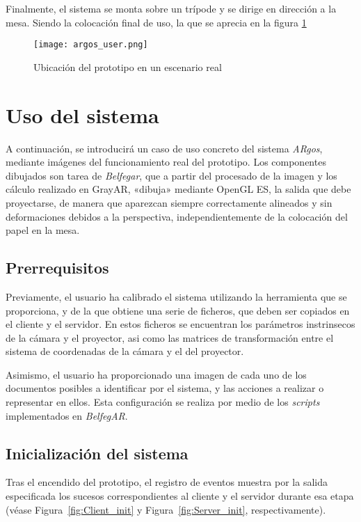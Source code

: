 Finalmente, el sistema se monta sobre un trípode y se dirige en dirección a la mesa. Siendo la colocación final de uso, la que se aprecia en la figura \ref{fig:ARgos_user} 

\begin{figure}
  \begin{center}
    \texttt{[image: argos\_user.png]}
    \caption{Ubicación del prototipo en un escenario real}
    \label{fig:ARgos_user}
  \end{center}
\end{figure}

\section{Uso del sistema}

A continuación, se introducirá un caso de uso concreto del sistema \textit{ARgos}, mediante imágenes del funcionamiento real del prototipo. Los componentes dibujados son tarea de \textit{Belfegar}, que a partir del procesado de la imagen y los cálculo realizado en GrayAR, «dibuja» mediante OpenGL ES, la salida que debe proyectarse, de manera que aparezcan siempre correctamente alineados y sin deformaciones debidos a la  perspectiva, independientemente de la colocación del papel en la mesa.

\subsection{Prerrequisitos}
Previamente, el usuario ha calibrado el sistema utilizando la herramienta que se proporciona, y de la que obtiene una serie de ficheros, que deben ser copiados en el cliente y el servidor. En estos ficheros se encuentran los parámetros instrinsecos de la cámara y el proyector, asi como las matrices de transformación entre el sistema de coordenadas de la cámara y el del proyector.

Asimismo, el usuario ha proporcionado una imagen de cada uno de los documentos posibles a identificar por el sistema, y las acciones a realizar o representar en ellos. Esta configuración se realiza por medio de los \textit{scripts} implementados en \textit{BelfegAR}.
 
\subsection{Inicialización del sistema}
Tras el encendido del prototipo, el registro de eventos muestra por la salida especificada los sucesos correspondientes al cliente y el servidor durante esa etapa (véase Figura~\ref{fig:Client_init} y
Figura~\ref{fig:Server_init}, respectivamente). 


